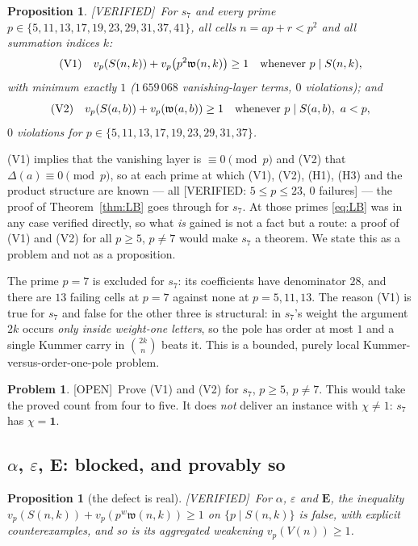 \documentclass[11pt,reqno]{amsart}
\theoremstyle{plain}
\newtheorem{proposition}[theorem]{Proposition}
\theoremstyle{definition}
\newtheorem{problem}[theorem]{Problem}
\theoremstyle{remark}
\newcommand{\vp}{v_p}
\newcommand{\bin}[2]{\binom{#1}{#2}}
\newcommand{\Verified}{\textup{\textsf{[VERIFIED]}}}
\newcommand{\VerifiedR}[1]{\textup{\textsf{[VERIFIED: #1]}}}
\newcommand{\Open}{\textup{\textsf{[OPEN]}}}
\numberwithin{equation}{section}
\begin{document}
\begin{proposition}\label{prop:s7}
\Verified\ For $s_7$ and every prime $p\in\{5,11,13,17,19,23,29,31,37,41\}$, all cells
$n=ap+r<p^2$ and all summation indices $k$:
\[
  \textup{(V1)}\quad \vp(S(n,k))+\vp\bigl(p^{2}\mathfrak w(n,k)\bigr)\ge1
  \quad\text{whenever }p\mid S(n,k),
\]
with minimum exactly $1$ ($1\,659\,068$ vanishing-layer terms, $0$ violations); and
\[
  \textup{(V2)}\quad \vp(S(a,b))+\vp(\mathfrak w(a,b))\ge1
  \quad\text{whenever }p\mid S(a,b),\ a<p,
\]
$0$ violations for $p\in\{5,11,13,17,19,23,29,31,37\}$.
\end{proposition}

\noindent
\textup{(V1)} implies that the vanishing layer is $\equiv0\pmod p$ and \textup{(V2)} that
$\Delta(a)\equiv0\pmod p$, so at each prime at which \textup{(V1)}, \textup{(V2)}, (H1),
(H3) and the product structure are known --- all \VerifiedR{$5\le p\le23$, $0$ failures}
--- the proof of Theorem~\ref{thm:LB} goes through for $s_7$. At those primes
\eqref{eq:LB} was in any case verified directly, so what \emph{is} gained is not a fact but
a route: a proof of \textup{(V1)} and \textup{(V2)} for all $p\ge5$, $p\ne7$ would make
$s_7$ a theorem. We state this as a problem and not as a proposition.

The prime $p=7$ is excluded for $s_7$: its coefficients have denominator $28$, and there are
$13$ failing cells at $p=7$ against none at $p=5,11,13$. The reason (V1) is true for $s_7$
and false for the other three is structural: in $s_7$'s weight the argument $2k$ occurs
\emph{only inside weight-one letters}, so the pole has order at most $1$ and a single Kummer
carry in $\bin{2k}n$ beats it. This is a bounded, purely local Kummer-versus-order-one-pole
problem.

\begin{problem}\label{prob:s7}
\Open\ Prove (V1) and (V2) for $s_7$, $p\ge5$, $p\ne7$. This would take the proved count
from four to five. It does \emph{not} deliver an instance with $\chi\ne1$: $s_7$ has
$\chi=\mathbf 1$.
\end{problem}

\subsection{$\alpha$, $\varepsilon$, $\mathbf E$: blocked, and provably so}\label{sec:blocked}

\begin{proposition}[the defect is real]\label{prop:defectreal}
\Verified\ For $\alpha$, $\varepsilon$ and $\mathbf E$, the inequality
$\vp(S(n,k))+\vp(p^{w}\mathfrak w(n,k))\ge1$ on $\{p\mid S(n,k)\}$ is \emph{false}, with
explicit counterexamples, and so is its aggregated weakening $\vp(V(n))\ge1$.
\end{proposition}
\end{document}
